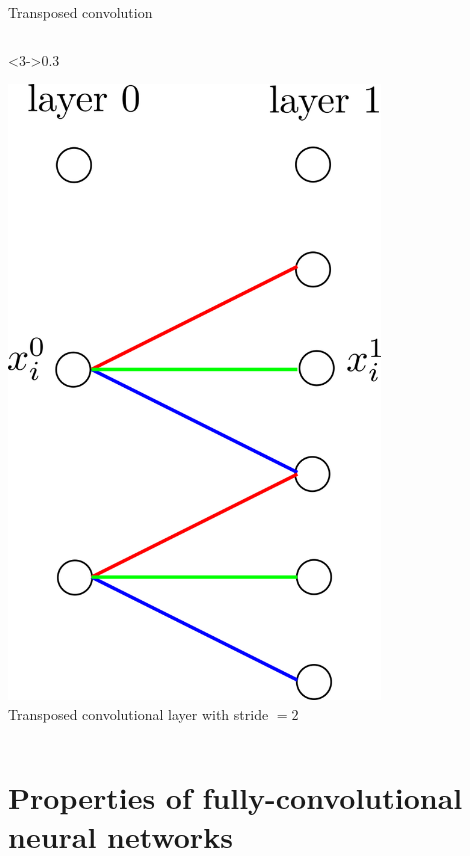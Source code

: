 \documentclass[xcolor=pdftex,dvipsnames,table,mathserif]{beamer}
\begin{document}
\begin{frame}{Transposed convolution}
\begin{columns}
    \begin{column}<3->{0.3\textwidth}
      \begin{center}
        \includegraphics[width=0.74\textwidth]{transposed_conv_stride.png}
        \\ \scriptsize{Transposed convolutional layer with stride $=2$}
      \end{center}
    \end{column}

  \end{columns}


\end{frame}


\section[Properties]{Properties of fully-convolutional neural networks}

\end{document}
